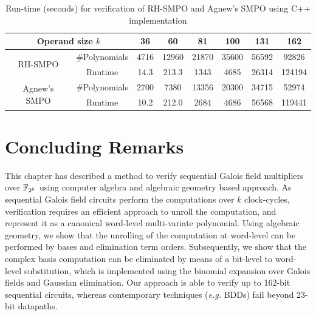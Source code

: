 \begin{table}[hbt]
\centering
\caption{\small Run-time (seconds) for verification of
  RH-SMPO and Agnew's SMPO using C++ implementation}
\label{tab:Cpp}
{\small 
\begin{tabular}{|c|c||c|c|c|c|c|c|}
\hline
\multicolumn{2}{|c||}{\centering Operand size $k$} & 36 & 60 & 81 & 100 & 131 & 162 \\
\hline
\multirow{2}{2cm}{\centering RH-SMPO} & \#Polynomials & 4716 & 12960 & 21870 & 35600 & 56592 & 92826 \\
\cline{2-8}
 & Runtime & 14.3 & 213.3 & 1343 & 4685 & 26314 & 124194 \\
\hline
\multirow{2}{2cm}{\centering Agnew's SMPO} & \#Polynomials & 2700 & 7380 & 13356 & 20300 & 34715 & 52974 \\
\cline{2-8}
 & Runtime & 10.2 & 212.0 & 2684 & 4686 & 56568 & 119441 \\
 
 \hline

 
\end{tabular}
}
\end{table}


\section{Concluding Remarks}

This chapter has described a method to verify sequential Galois field
multipliers over ${\mathbb{F}}_{2^k}$ using computer algebra and algebraic geometry
based approach. As sequential Galois field circuits perform the
computations over $k$ clock-cycles, verification requires an efficient
approach to unroll the computation, and represent it as a canonical
word-level multi-variate polynomial. Using algebraic geometry, we show
that the unrolling of the computation at word-level can be performed by
\Grobner bases and elimination term orders. Subsequently, we show
that the complex \Grobner basis computation can be eliminated by means
of a bit-level to word-level substitution, which is implemented using
the binomial expansion over Galois fields and Gaussian
elimination. Our approach is able to verify up to 162-bit sequential
circuits, whereas contemporary techniques ({\it e.g.} BDDs) fail beyond 23-bit
datapaths.  

